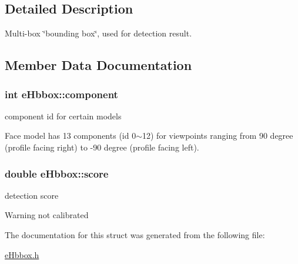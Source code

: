 \subsection{Detailed Description}
Multi-\/box \char`\"{}bounding box\char`\"{}, used for detection result. 

\subsection{Member Data Documentation}
\hypertarget{structeHbbox_a7c6a5e808464ba2420a4b43461a5153e}{
\subsubsection[{component}]{\setlength{\rightskip}{0pt plus 5cm}int e\-Hbbox\-::component}}\label{structeHbbox_a7c6a5e808464ba2420a4b43461a5153e}


component id for certain models 

Face model has 13 components (id 0$\sim$12) for viewpoints ranging from 90 degree (profile facing right) to -\/90 degree (profile facing left). \hypertarget{structeHbbox_a90d1b31a19d0facdeb4caaaba11af54d}{
\subsubsection[{score}]{\setlength{\rightskip}{0pt plus 5cm}double e\-Hbbox\-::score}}\label{structeHbbox_a90d1b31a19d0facdeb4caaaba11af54d}


detection score 

\begin{DoxyWarning}{Warning}
not calibrated 
\end{DoxyWarning}


The documentation for this struct was generated from the following file\-:\begin{DoxyCompactItemize}
\item 
\hyperlink{eHbbox_8h}{e\-Hbbox.\-h}\end{DoxyCompactItemize}
